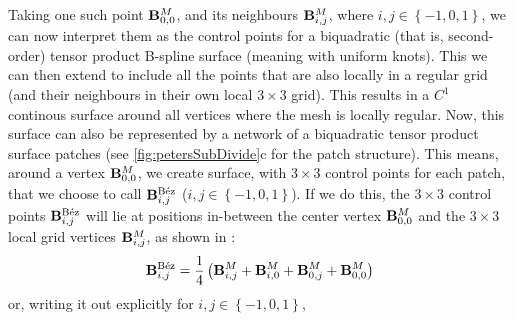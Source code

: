Taking one such point $\petersLocalPatchPointIndices{0,0}$, and its neighbours $\petersLocalPatchPointIndices{i,j}$, where $i,j \in \left \lbrace-1,0,1\right \rbrace$, we can now interpret them as the control points for a biquadratic (that is, second-order) tensor product B-spline surface (meaning with uniform knots). This we can then extend to include all the points that are also locally in a regular grid (and their neighbours in their own local $3\times3$ grid). This results in a $C^1$ continous surface around all vertices where the mesh is locally regular.
Now, this surface can also be represented by a network of a biquadratic tensor product \Bez surface patches (see \autoref{fig:petersSubDivide}c for the patch structure). This means, around a vertex $\petersLocalPatchPointIndices{0,0}$, we create \Bez surface, with $3\times3$ control points for each patch, that we choose to call $\petersLocalBezPointIndices{i,j}$ ($i,j \in \left \lbrace-1,0,1\right \rbrace$). If we do this, the $3\times3$ \Bez control points $\petersLocalBezPointIndices{i,j}$ will lie at positions in-between the center vertex $\petersLocalPatchPointIndices{0,0}$ and the $3\times3$ local grid vertices $\petersLocalPatchPointIndices{i,j}$, as shown in \cite{peters1992constructing}:
\begin{equation}
\petersLocalBezPointIndices{i,j} = \frac{1}{4}\left(\petersLocalPatchPointIndices{i,j} + \petersLocalPatchPointIndices{i,0} + \petersLocalPatchPointIndices{0,j} + \petersLocalPatchPointIndices{0,0}\right)
\end{equation}
or, writing it out explicitly for $i,j \in \left \lbrace-1,0,1\right \rbrace$,

